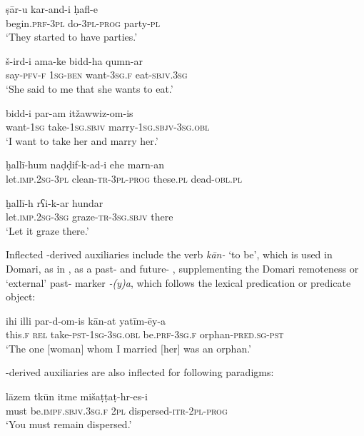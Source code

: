\documentclass[output=paper]{langsci/langscibook}
\begin{document}
\ex
\gll ṣār-u  kar-and-i  ḥafl-e\\
     begin.\textsc{prf-3pl} do-\textsc{3pl}-\textsc{prog}  party-\textsc{pl}\\
\glt ‘They started to have parties.’
\z
\z

\ea
\ea
\gll š-ird-i  ama-ke bidd-ha qumn-ar\\
     say-\textsc{pfv-f} \textsc{1sg-ben} want-\textsc{3sg.f} eat-\textsc{sbjv.3sg}\\
\glt ‘She said to me that she wants to eat.’

\ex
\gll bidd-i  par-am itžawwiz-om-is\\
     want-\textsc{1sg} take-\textsc{1sg.sbjv} marry-\textsc{1sg.sbjv-3sg.obl}\\
\glt ‘I want to take her and marry her.’
\z
\z

\ea
\ea
\gll ḫallī-hum naḍḍif-k-ad-i ehe marn-an  \\
     let.\textsc{imp.2sg-3pl} clean-\textsc{tr-3pl-prog} these.\textsc{pl} dead-\textsc{obl.pl}\\

\ex
\gll ḫallī-h rʕi-k-ar hundar\\
     let.\textsc{imp.2sg}-\textsc{3sg} graze-\textsc{tr-3sg.sbjv} there\\
\glt ‘Let it graze there.’
\z
\z

Inflected -derived auxiliaries include the  verb \textit{kān-} ‘to be’, which is used in Domari, as in , as a past- and future- , supplementing the Domari remoteness or ‘external’ past- marker \textit{-(y)a}, which follows the lexical predication or predicate object:

\ea \gll ihi illi par-d-om-is kān-at yatīm-ēy-a\\
     this.\textsc{f} \textsc{rel} take-\textsc{pst-1sg-3sg.obl} be.\textsc{prf-3sg.f} orphan-\textsc{pred.sg-pst}\\
\glt ‘The one [woman] whom I married [her] was an orphan.’ \label{ihi}
\z

\noindent {}-derived auxiliaries are also inflected for  following  paradigms:

\ea \gll   lāzem tkūn itme mišaṭṭaṭ-hr-es-i\\
       must be.\textsc{impf.sbjv.3sg.f} \textsc{2pl} dispersed-\textsc{itr-2pl-prog}\\
\glt   ‘You must remain dispersed.’
\z
\end{document}
